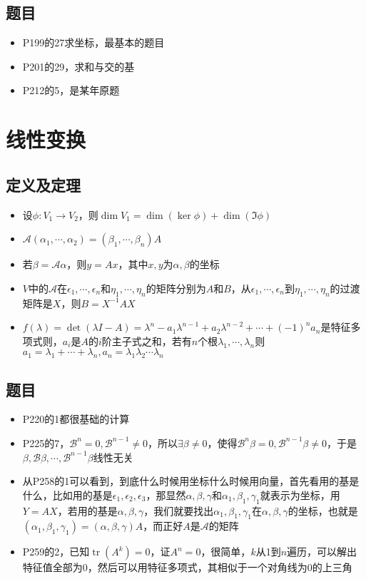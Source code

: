 \documentclass[UTF8]{ctexart}
\DeclareMathOperator{\tr}{tr}
\begin{document}
\subsection{题目}
\begin{itemize}
\item P199的27求坐标，最基本的题目
\item P201的29，求和与交的基
\item P212的5，是某年原题
\end{itemize}

\section{线性变换}
\subsection{定义及定理}
\begin{itemize}
\item 设$\phi:V_1\to V_2$，则$\dim V_1=\dim(\ker\phi)+\dim(\Im\phi)$
\item $\mathcal{A}(\alpha_1,\cdots,\alpha_2)=(\beta_1,\cdots,\beta_n)A$
\item 若$\beta=\mathcal{A}\alpha$，则$y=Ax$，其中$x,y$为$\alpha,\beta$的坐标
\item $V$中的$\mathcal{A}$在$\epsilon_1,\cdots,\epsilon_n$和$\eta_1,\cdots,\eta_n$的矩阵分别为$A$和$B$，从$\epsilon_1,\cdots,\epsilon_n$到$\eta_1,\cdots,\eta_n$的过渡矩阵是$X$，则$B=X^{-1}AX$
\item $f(\lambda)=\det(\lambda I-A)=\lambda^n-a_1\lambda^{n-1}+a_2\lambda^{n-2}+\cdots+(-1)^n a_n$是特征多项式则，$a_i$是$A$的$i$阶主子式之和，若有$n$个根$\lambda_1,\cdots,\lambda_n$则$a_1=\lambda_1+\cdots+\lambda_n,a_n=\lambda_1\lambda_2\cdots\lambda_n$
\end{itemize}
\subsection{题目}
\begin{itemize}
\item P220的1都很基础的计算

\item P225的7，$\mathcal{B}^n=0,\mathcal{B}^{n-1}\neq 0$，所以$\exists \beta\neq 0$，使得$\mathcal{B}^n\beta=0,\mathcal{B}^{n-1}\beta\neq 0$，于是$\beta,\mathcal{B}\beta,\cdots,\mathcal{B}^{n-1}\beta$线性无关

\item 从P258的1可以看到，到底什么时候用坐标什么时候用向量，首先看用的基是什么，比如用的基是$\epsilon_1,\epsilon_2,\epsilon_3$，那显然$\alpha,\beta,\gamma$和$\alpha_1,\beta_1,\gamma_1$就表示为坐标，用$Y=AX$，若用的基是$\alpha,\beta,\gamma$，我们就要找出$\alpha_1,\beta_1,\gamma_1$在$\alpha,\beta,\gamma$的坐标，也就是$(\alpha_1,\beta_1,\gamma_1)=(\alpha,\beta,\gamma)A$，而正好$A$是$\mathcal{A}$的矩阵

\item P259的2，已知$\tr(A^k)=0$，证$A^n=0$，很简单，$k$从1到$n$遍历，可以解出特征值全部为0，然后可以用特征多项式，其相似于一个对角线为0的上三角
\end{itemize}
\end{document}
